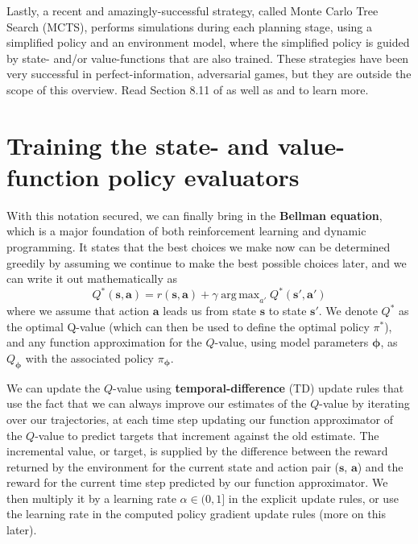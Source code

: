 \documentclass{article}
\DeclareMathOperator*{\argmax}{arg\,max}
\begin{document}
Lastly, a recent and amazingly-successful strategy, called Monte Carlo Tree Search (MCTS), performs simulations during each planning stage, using a simplified policy and an environment model, where the simplified policy is guided by state- and/or value-functions that are also trained. These strategies have been very successful in perfect-information, adversarial games, but they are outside the scope of this overview. Read Section 8.11 of \cite{sutton_barto_rl} as well as \cite{go1} and \cite{go2} to learn more.

\section{Training the state- and value-function policy evaluators\label{sec:value_training}}

With this notation secured, we can finally bring in the \textbf{Bellman equation}, which is a major foundation of both reinforcement learning and dynamic programming. It states that the best choices we make now can be determined greedily by assuming we continue to make the best possible choices later, and we can write it out mathematically as
\begin{equation}\label{eq:bellman}
Q^\ast(\mathbf{s},\mathbf{a})=r(\mathbf{s},\mathbf{a})+\gamma \argmax_{a'}Q^\ast(\mathbf{s}',\mathbf{a}')
\end{equation}where we assume that action $\mathbf{a}$ leads us from state $\mathbf{s}$ to state $\mathbf{s}'$. We denote $Q^\ast$ as the optimal Q-value (which can then be used to define the optimal policy $\pi^\ast$), and any function approximation for the $Q$-value, using model parameters $\boldsymbol{\phi}$, as $Q_{\boldsymbol{\phi}}$ with the associated policy $\pi_{\boldsymbol{\phi}}$.

We can update the $Q$-value using \textbf{temporal-difference} (TD) update rules that use the fact that we can always improve our estimates of the $Q$-value by iterating over our trajectories, at each time step updating our function approximator of the $Q$-value to predict targets that increment against the old estimate. The incremental value, or target, is supplied by the difference between the  reward returned by the environment for the current state and action pair ($\mathbf{s}$, $\mathbf{a}$) and the reward for the current time step predicted by our function approximator. We then multiply it by a learning rate $\alpha\in(0,1]$ in the explicit update rules, or use the learning rate in the computed policy gradient update rules (more on this later). 
\end{document}

